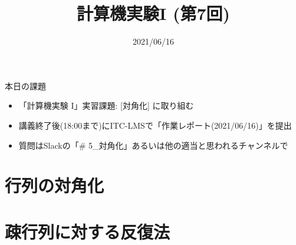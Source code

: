 \documentclass[10pt,dvipdfmx]{beamer}
\title{計算機実験I (第7回)}
\date{2021/06/16}
\begin{document}
\begin{frame}
  \titlepage
  \tableofcontents
\end{frame}

\begin{frame}[t]{本日の課題}
  \begin{itemize}
  \item 「計算機実験 I」実習課題: [対角化] に取り組む
  \item 講義終了後(18:00まで)にITC-LMSで「作業レポート(2021/06/16)」を提出
  \item 質問はSlackの「\# 5\_対角化」あるいは他の適当と思われるチャンネルで \\[2em]
  \end{itemize}
\end{frame}

\section{行列の対角化}



\section{疎行列に対する反復法}















\end{document}
